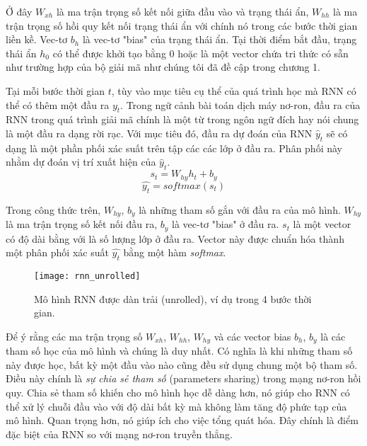 Ở đây $W_{xh}$ là ma trận trọng số kết nối giữa đầu vào và trạng thái ẩn, $W_{hh}$ là ma trận trọng số hồi quy kết nối trạng thái ẩn với chính nó trong các bước thời gian liền kề. Vec-tơ $b_h$ là vec-tơ "bias" của trạng thái ẩn. Tại thời điểm bắt đầu, trạng thái ẩn $h_0$ có thể được khởi tạo bằng 0 hoặc là một vector chứa tri thức có sẵn như trường hợp của bộ giải mã như chúng tôi đã đề cập trong chương 1.

Tại mỗi bước thời gian $t$, tùy vào mục tiêu cụ thể của quá trình học mà RNN có thể có thêm một đầu ra $y_t$. Trong ngữ cảnh bài toán dịch máy nơ-ron, đầu ra của RNN trong quá trình giải mã chính là một từ trong ngôn ngữ đích hay nói chung là một đầu ra dạng rời rạc. Với mục tiêu đó, đầu ra dự đoán của RNN $\hat{y}_t$ sẽ có dạng là một phần phối xác suất trên tập các các lớp ở đầu ra. Phân phối này nhằm dự đoán vị trí xuất hiện của $\hat{y}_t$.
\begin{equation} \label{rnnOuputSoftmax}
	s_t = W_{hy}h_t + b_y
\end{equation} 
\begin{equation} \label{rnnOuputSoftmaxDistribution}
	\hat{y_t} = softmax(s_t)
\end{equation}

Trong công thức trên, $W_{hy}$, $b_y$ là những tham số gắn với đầu ra của mô hình. $W_{hy}$ là ma trận trọng số kết nối đầu ra, $b_y$ là vec-tơ "bias" ở đầu ra. $s_t$ là một vector có độ dài bằng với là số lượng lớp ở đầu ra. Vector này được chuẩn hóa thành một phân phối xác suất $\hat{y_t}$ bằng một hàm \textit{softmax}.

\begin{figure}
	\centering
	\texttt{[image: rnn\_unrolled]}
	\caption[Mô hình RNN dạng dàn trải]{Mô hình RNN được dàn trải (unrolled), ví dụ trong 4 bước thời gian.}
	\label{fig_rnn_unrolled}
\end{figure}

Để ý rằng các ma trận trọng số $W_{xh}$, $W_{hh}$, $W_{hy}$ và các vector bias $b_h$, $b_y$ là các tham số học của mô hình và chúng là duy nhất. Có nghĩa là khi những tham số này được học, bất kỳ một đầu vào nào cũng đều sử dụng chung một bộ tham số. Điều này chính là \textit{sự chia sẻ tham số} (parameters sharing) trong mạng nơ-ron hồi quy. Chia sẻ tham số khiến cho mô hình học dễ dàng hơn, nó giúp cho RNN có thể xử lý chuỗi đầu vào với độ dài bất kỳ mà không làm tăng độ phức tạp của mô hình. Quan trọng hơn, nó giúp ích cho việc tổng quát hóa. Đây chính là điểm đặc biệt của RNN so với mạng nơ-ron truyền thẳng.

